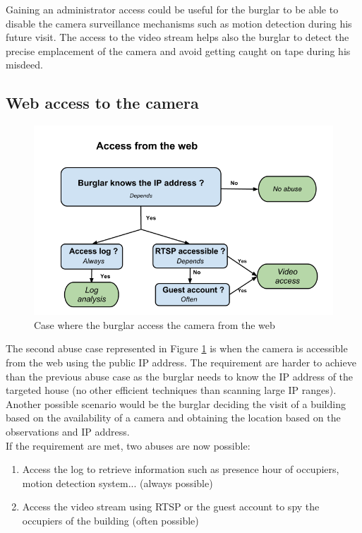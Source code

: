 Gaining an administrator access could be useful for the burglar to be able to disable the camera surveillance mechanisms such as motion detection during his future visit.
The access to the video stream helps also the burglar to detect the precise emplacement of the camera and avoid getting caught on tape during his misdeed.

\subsection{Web access to the camera}

\begin{figure}[h]
  \centering
  \includegraphics[width=13cm]{images/burglar-outside.png}
  \caption{Case where the burglar access the camera from the web}
  \label{fig:burglar-outside}
\end{figure}

The second abuse case represented in Figure \ref{fig:burglar-outside} is when the camera is accessible from the web using the public IP address.
The requirement are harder to achieve than the previous abuse case as the burglar needs to know the IP address of the targeted house (no other efficient techniques than scanning large IP ranges).
Another possible scenario would be the burglar deciding the visit of a building based on the availability of a camera and obtaining the location based on the observations and IP address.\\

If the requirement are met, two abuses are now possible:
\begin{enumerate}
\item Access the log to retrieve information such as presence hour of occupiers, motion detection system... (always possible)
\item Access the video stream using RTSP or the guest account to spy the occupiers of the building (often possible)
\end{enumerate}

